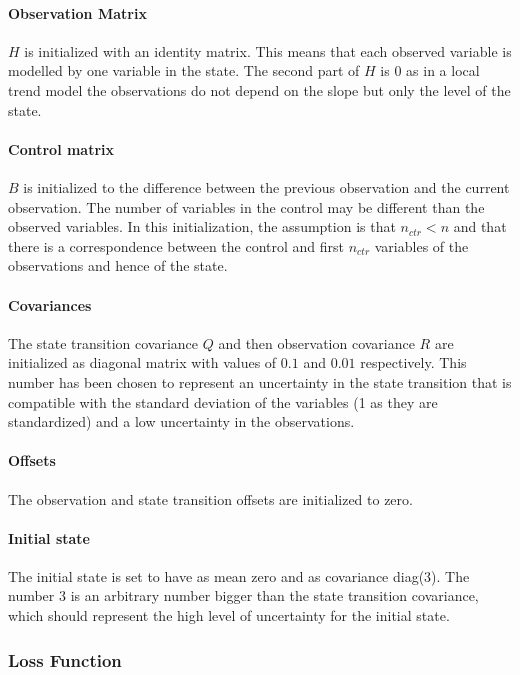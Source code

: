 \documentclass{article}
\begin{document}
\paragraph{Observation Matrix} $H$ is initialized with an identity matrix. This means that each observed variable is modelled by one variable in the state. The second part of $H$ is 0 as in a local trend model the observations do not depend on the slope but only the level of the state.

\paragraph{Control matrix} $B$ is initialized to the difference between the previous observation and the current observation. The number of  variables in the control may be different than the observed variables. In this initialization, the assumption is that $n_{ctr} < n$ and that there is a correspondence between the control and first $n_{ctr}$ variables of the observations and hence of the state.

\paragraph{Covariances} The state transition covariance $Q$ and then observation covariance $R$ are initialized as diagonal matrix with values of $0.1$ and $0.01$ respectively. This number has been chosen to represent an uncertainty in the state transition that is compatible with the standard deviation of the variables (1 as they are standardized) and a low uncertainty in the observations. 

\paragraph{Offsets} The observation and state transition offsets are initialized to zero.

\paragraph{Initial state} The initial state is set to have as mean zero and as covariance diag(3). The number 3 is an arbitrary number bigger than the state transition covariance, which should represent the high level of uncertainty for the initial state.  

\subsubsection{Loss Function}
\end{document}

